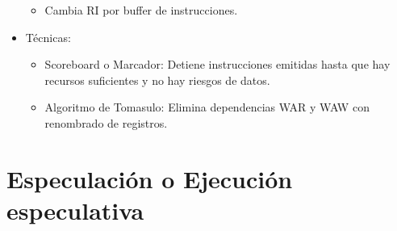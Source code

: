 \documentclass[12pt, twoside, openright]{report} %
\begin{document}
\begin{itemize}
\begin{itemize}
		      \item Cambia RI por buffer de instrucciones.
	      \end{itemize}
	\item Técnicas:


	      \begin{itemize}
		      \item Scoreboard o Marcador: Detiene instrucciones emitidas hasta que hay
		            recursos suficientes y no hay riesgos de datos.
		      \item Algoritmo de Tomasulo: Elimina dependencias WAR y WAW con
		            renombrado de registros.
	      \end{itemize}
\end{itemize}

\section{Especulación o Ejecución especulativa}
\end{document}
